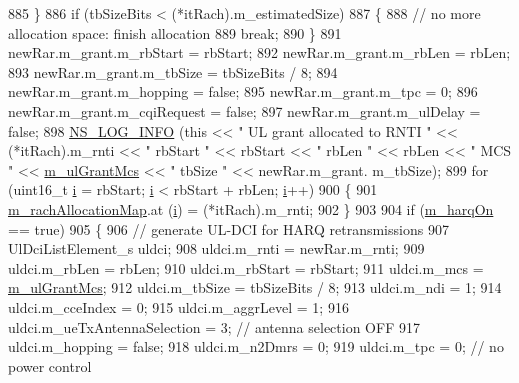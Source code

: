 \begin{DoxyCode}
885         \}
886       \textcolor{keywordflow}{if} (tbSizeBits < (*itRach).m\_estimatedSize)
887         \{
888           \textcolor{comment}{// no more allocation space: finish allocation}
889           \textcolor{keywordflow}{break};
890         \}
891       newRar.m\_grant.m\_rbStart = rbStart;
892       newRar.m\_grant.m\_rbLen = rbLen;
893       newRar.m\_grant.m\_tbSize = tbSizeBits / 8;
894       newRar.m\_grant.m\_hopping = \textcolor{keyword}{false};
895       newRar.m\_grant.m\_tpc = 0;
896       newRar.m\_grant.m\_cqiRequest = \textcolor{keyword}{false};
897       newRar.m\_grant.m\_ulDelay = \textcolor{keyword}{false};
898       \hyperlink{group__logging_gafbd73ee2cf9f26b319f49086d8e860fb}{NS\_LOG\_INFO} (\textcolor{keyword}{this} << \textcolor{stringliteral}{" UL grant allocated to RNTI "} << (*itRach).m\_rnti << \textcolor{stringliteral}{" rbStart "} << 
      rbStart << \textcolor{stringliteral}{" rbLen "} << rbLen << \textcolor{stringliteral}{" MCS "} << \hyperlink{classns3_1_1CqaFfMacScheduler_a6ecc5189910f7224f44baf74d8fa8684}{m\_ulGrantMcs} << \textcolor{stringliteral}{" tbSize "} << newRar.m\_grant.
      m\_tbSize);
899       \textcolor{keywordflow}{for} (uint16\_t \hyperlink{bernuolliDistribution_8m_a6f6ccfcf58b31cb6412107d9d5281426}{i} = rbStart; \hyperlink{bernuolliDistribution_8m_a6f6ccfcf58b31cb6412107d9d5281426}{i} < rbStart + rbLen; \hyperlink{bernuolliDistribution_8m_a6f6ccfcf58b31cb6412107d9d5281426}{i}++)
900         \{
901           \hyperlink{classns3_1_1CqaFfMacScheduler_a813fe1147a11b3b5c34d9a345535a920}{m\_rachAllocationMap}.at (\hyperlink{bernuolliDistribution_8m_a6f6ccfcf58b31cb6412107d9d5281426}{i}) = (*itRach).m\_rnti;
902         \}
903       
904       \textcolor{keywordflow}{if} (\hyperlink{classns3_1_1CqaFfMacScheduler_afcb424ab57ad0d96293a7970c0b55dcf}{m\_harqOn} == \textcolor{keyword}{true})
905         \{
906           \textcolor{comment}{// generate UL-DCI for HARQ retransmissions}
907           UlDciListElement\_s uldci;
908           uldci.m\_rnti = newRar.m\_rnti;
909           uldci.m\_rbLen = rbLen;
910           uldci.m\_rbStart = rbStart;
911           uldci.m\_mcs = \hyperlink{classns3_1_1CqaFfMacScheduler_a6ecc5189910f7224f44baf74d8fa8684}{m\_ulGrantMcs};
912           uldci.m\_tbSize = tbSizeBits / 8;
913           uldci.m\_ndi = 1;
914           uldci.m\_cceIndex = 0;
915           uldci.m\_aggrLevel = 1;
916           uldci.m\_ueTxAntennaSelection = 3; \textcolor{comment}{// antenna selection OFF}
917           uldci.m\_hopping = \textcolor{keyword}{false};
918           uldci.m\_n2Dmrs = 0;
919           uldci.m\_tpc = 0; \textcolor{comment}{// no power control}

\end{DoxyCode}

